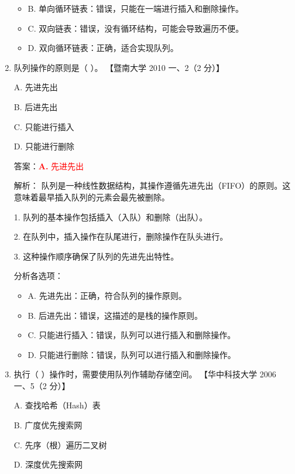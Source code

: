 \documentclass[lang=cn,newtx,10pt,scheme=chinese]{../../../elegantbook}
\begin{document}
\begin{enumerate}
\begin{itemize}
        \item B. 单向循环链表：错误，只能在一端进行插入和删除操作。
        
        \item C. 双向链表：错误，没有循环结构，可能会导致遍历不便。
        
        \item D. 双向循环链表：正确，适合实现队列。
    \end{itemize}

    \item 队列操作的原则是（ ）。  
    【暨南大学 2010 一、2（2 分）】  

    A. 先进先出  

    B. 后进先出  

    C. 只能进行插入  

    D. 只能进行删除  

    答案：\textcolor{red}{\textbf{A.} 先进先出}

    解析：
    队列是一种线性数据结构，其操作遵循先进先出（FIFO）的原则。这意味着最早插入队列的元素会最先被删除。

    1. 队列的基本操作包括插入（入队）和删除（出队）。

    2. 在队列中，插入操作在队尾进行，删除操作在队头进行。

    3. 这种操作顺序确保了队列的先进先出特性。

    分析各选项：
    \begin{itemize}
        \item A. 先进先出：正确，符合队列的操作原则。
        
        \item B. 后进先出：错误，这描述的是栈的操作原则。
        
        \item C. 只能进行插入：错误，队列可以进行插入和删除操作。
        
        \item D. 只能进行删除：错误，队列可以进行插入和删除操作。
    \end{itemize}

    \item 执行（ ）操作时，需要使用队列作辅助存储空间。  
    【华中科技大学 2006 一、5（2 分）】  

    A. 查找哈希（Hash）表  

    B. 广度优先搜索网  

    C. 先序（根）遍历二叉树  

    D. 深度优先搜索网  


\end{enumerate}
\end{document}
